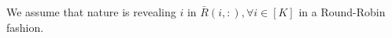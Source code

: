
\begin{assumption}
\label{assm:round-robin}
We assume that nature is revealing $i$ in $\bar{R}(i,:), \forall i\in [K]$  in a Round-Robin fashion.
\end{assumption}



%
